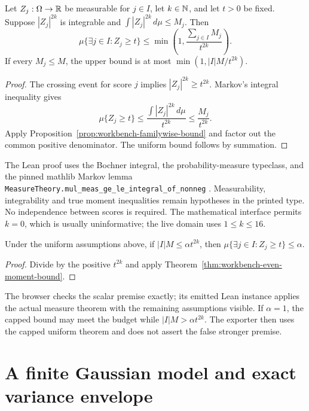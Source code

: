 \begin{theorem}
\label{thm:workbench-even-moment-bound}
Let \(Z_j:\Omega\to\mathbb{R}\) be measurable for \(j\in I\), let \(k\in\mathbb{N}\),
and let \(t>0\) be fixed. Suppose \(|Z_j|^{2k}\) is integrable and
\(\int |Z_j|^{2k}\,d\mu\leq M_j\). Then
\[
 \mu\{\exists j\in I:Z_j\geq t\}
 \leq \min\left(1,\frac{\sum_{j\in I}M_j}{t^{2k}}\right).
\]
If every \(M_j\leq M\), the upper bound is at most
\(\min(1,|I|M/t^{2k})\).
\end{theorem}
\begin{proof}
The crossing event for score \(j\) implies
\(|Z_j|^{2k}\geq t^{2k}\). Markov's integral inequality gives
\[
 \mu\{Z_j\geq t\}\leq
 \frac{\int |Z_j|^{2k}\,d\mu}{t^{2k}}\leq\frac{M_j}{t^{2k}}.
\]
Apply Proposition~\ref{prop:workbench-familywise-bound} and factor out the
common positive denominator. The uniform bound follows by summation.
\end{proof}

The Lean proof uses the Bochner integral, the probability-measure typeclass,
and the pinned mathlib Markov lemma
\texttt{MeasureTheory.mul\_meas\_ge\_le\_integral\_of\_nonneg}
\citep{wbMathlibPinned}. Measurability, integrability and true moment
inequalities remain hypotheses in the printed type. No independence between
scores is required. The mathematical interface permits \(k=0\), which is
usually uninformative; the live domain uses \(1\leq k\leq16\).

\begin{corollary}
\label{cor:workbench-moment-threshold}
Under the uniform assumptions above, if
\(|I|M\leq\alpha t^{2k}\), then
\(\mu\{\exists j\in I:Z_j\geq t\}\leq\alpha\).
\end{corollary}
\begin{proof}
Divide by the positive \(t^{2k}\) and apply
Theorem~\ref{thm:workbench-even-moment-bound}.
\end{proof}

The browser checks the scalar premise exactly; its emitted Lean instance
applies the actual measure theorem with the remaining assumptions visible.
If \(\alpha=1\), the capped bound may meet the budget while
\(|I|M>\alpha t^{2k}\). The exporter then uses the capped uniform theorem
and does not assert the false stronger premise.

\section{A finite Gaussian model and exact variance envelope}

